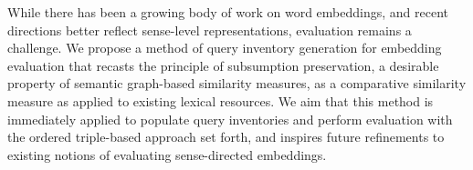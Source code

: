 While there has been a growing body of work on word embeddings, and recent directions better reflect sense-level representations, evaluation remains a challenge. We propose a method of query inventory generation for embedding evaluation that recasts the principle of subsumption preservation, a desirable property of semantic graph-based similarity measures, as a comparative similarity measure as applied to existing lexical resources. We aim that this method is immediately applied to populate query inventories and perform evaluation with the ordered triple-based approach set forth, and inspires future refinements to existing notions of evaluating sense-directed embeddings.
